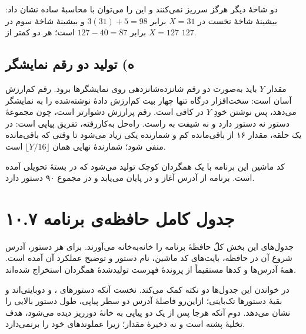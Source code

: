 \documentclass[12pt,a4paper]{article}
\begin{document}
	دو شاخهٔ دیگر هرگز سرریز نمی‌کنند و این را می‌توان با محاسبهٔ ساده نشان داد: بیشینهٔ شاخهٔ نخست در \(X=31\) برابر \(3(31)+5=98\) و بیشینهٔ شاخهٔ سوم در \(X=127\) برابر \(127-40=87\) است؛ هر دو کمتر از \(127\).

	\subsection*{ه) تولید دو رقم نمایشگر}
	مقدار \(Y\) باید به‌صورت دو رقم شانزده‌شانزدهی روی نمایشگرها برود. رقم کم‌ارزش آسان است: سخت‌افزار درگاه تنها چهار بیت کم‌ارزش دادهٔ نوشته‌شده را به نمایشگر می‌دهد، پس نوشتن خودِ \(Y\) در  کافی است. رقم پرارزش دشوارتر است، چون مجموعهٔ دستور نه دستور  دارد و نه شیفت به راست. راه‌حل به‌کاررفته، تفریق پیاپی است: در یک حلقه، مقدار ۱۶ از باقی‌مانده کم و شمارنده یکی زیاد می‌شود تا وقتی که باقی‌مانده منفی شود؛ شمارندهٔ نهایی همان \(\lfloor Y/16 \rfloor\) است.


	کد ماشین این برنامه با یک همگردان کوچک تولید می‌شود که در بستهٔ تحویلی آمده است. برنامه از آدرس  آغاز و در  پایان می‌یابد و در مجموع ۹۰ دستور دارد.

	\section*{۱۰.۷ جدول کامل حافظه‌ی برنامه}
	جدول‌های این بخش کلّ حافظهٔ برنامه را خانه‌به‌خانه می‌آورند. برای هر دستور، آدرس شروع آن در حافظه، بایت‌های کد ماشین، نام دستور و توضیح عملکرد آن آمده است. همهٔ آدرس‌ها و کدها مستقیماً از پروندهٔ فهرست تولیدشدهٔ همگردان استخراج شده‌اند.

	در خواندن این جدول‌ها دو نکته کمک می‌کند. نخست آنکه دستورهای ،  و  دوبایتی‌اند و بقیهٔ دستورها تک‌بایتی؛ ازاین‌رو فاصلهٔ آدرس دو سطر پیاپی، طول دستور بالایی را نشان می‌دهد. دوم آنکه هرجا پس از یک  دو  پیاپی به خانهٔ دورریز دیده می‌شود، هدف تخلیهٔ پشته است و نه ذخیرهٔ مقدار؛ زیرا  عملوندهای خود را برنمی‌دارد.
\end{document}
